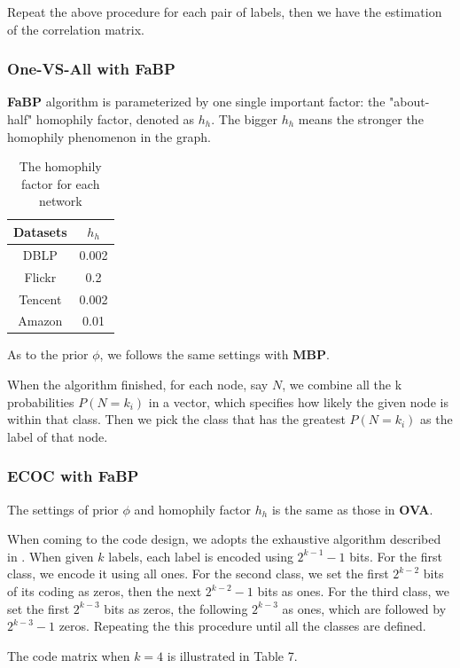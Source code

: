 Repeat the above procedure for each pair of labels, then we have the estimation of the correlation matrix.

\subsubsection*{One-VS-All with \textbf{FaBP}}
\textbf{FaBP} algorithm is parameterized by one single important factor: the "about-half" homophily factor, denoted as $h_h$. The bigger $h_h$ means the stronger the homophily phenomenon in the graph.

\begin{table}[!ht]
\centering
\begin{tabular}{c|c}
\toprule
\textbf{Datasets} & \textbf{$h_h$}\\
\midrule
DBLP & 0.002\\
Flickr & 0.2\\
Tencent & 0.002\\
Amazon & 0.01\\
\bottomrule
\end{tabular}
\caption{The homophily factor for each network}
\end{table} 

As to the prior $\phi$, we follows the same settings with \textbf{MBP}.

When the algorithm finished, for each node, say $N$, we combine all the k probabilities $P(N=k_i)$ in a vector, which specifies how likely the given node is within that class. Then we pick the class that has the greatest $P(N=k_i)$ as the label of that node.

\subsubsection*{ECOC with \textbf{FaBP}}
The settings of prior $\phi$ and homophily factor $h_h$ is the same as those in \textbf{OVA}.

When coming to the code design, we adopts the exhaustive algorithm described in \cite{Thomas1995}. When given $k$ labels, each label is encoded using $2^{k-1}-1$ bits. For the first class, we encode it using all ones. For the second class, we set the first $2^{k-2}$ bits of its coding as zeros, then the next $2^{k-2}-1$ bits as ones. For the third class, we set the first $2^{k-3}$ bits as zeros, the following $2^{k-3}$ as ones, which are followed by $2^{k-3}-1$ zeros. Repeating the this procedure until all the classes are defined. 

The code matrix when $k=4$ is illustrated in Table 7.

